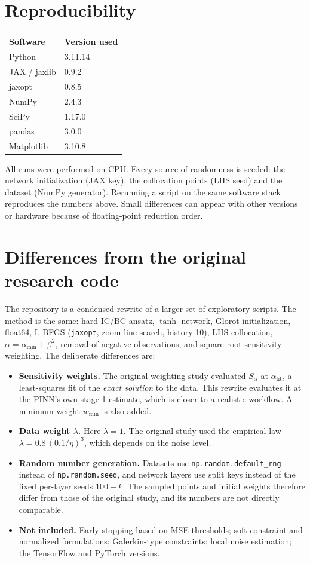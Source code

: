 \documentclass[10pt]{article}
\newcommand{\code}[1]{\texttt{#1}}
\begin{document}

\section{Reproducibility}
\begin{center}
\begin{tabular}{ll}
\toprule
Software & Version used\\
\midrule
Python & 3.11.14\\
JAX / jaxlib & 0.9.2\\
jaxopt & 0.8.5\\
NumPy & 2.4.3\\
SciPy & 1.17.0\\
pandas & 3.0.0\\
Matplotlib & 3.10.8\\
\bottomrule
\end{tabular}
\end{center}
All runs were performed on CPU. Every source of randomness is seeded: the network initialization (JAX key), the collocation points (LHS seed) and the dataset (NumPy generator). Rerunning a script on the same software stack reproduces the numbers above. Small differences can appear with other versions or hardware because of floating-point reduction order.

\section{Differences from the original research code}
The repository is a condensed rewrite of a larger set of exploratory scripts. The method is the same: hard IC/BC ansatz, $\tanh$ network, Glorot initialization, float64, L-BFGS (\code{jaxopt}, zoom line search, history 10), LHS collocation, $\alpha=\alpha_{\min}+\beta^2$, removal of negative observations, and square-root sensitivity weighting. The deliberate differences are:
\begin{itemize}
\item \textbf{Sensitivity weights.} The original weighting study evaluated $S_\alpha$ at $\alpha_{\text{fit}}$, a least-squares fit of the \emph{exact solution} to the data. This rewrite evaluates it at the PINN's own stage-1 estimate, which is closer to a realistic workflow. A minimum weight $w_{\min}$ is also added.
\item \textbf{Data weight $\lambda$.} Here $\lambda=1$. The original study used the empirical law $\lambda=0.8\,(0.1/\eta)^3$, which depends on the noise level.
\item \textbf{Random number generation.} Datasets use \code{np.random.default\_rng} instead of \code{np.random.seed}, and network layers use split keys instead of the fixed per-layer seeds $100+k$. The sampled points and initial weights therefore differ from those of the original study, and its numbers are not directly comparable.
\item \textbf{Not included.} Early stopping based on MSE thresholds; soft-constraint and normalized formulations; Galerkin-type constraints; local noise estimation; the TensorFlow and PyTorch versions.
\end{itemize}
\end{document}
